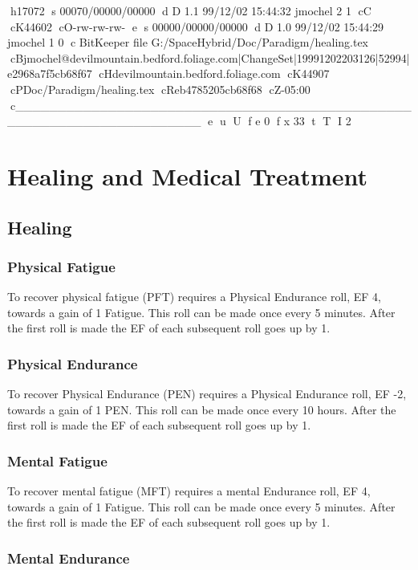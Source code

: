 h17072
s 00070/00000/00000
d D 1.1 99/12/02 15:44:32 jmochel 2 1
cC
cK44602
cO-rw-rw-rw-
e
s 00000/00000/00000
d D 1.0 99/12/02 15:44:29 jmochel 1 0
c BitKeeper file G:/SpaceHybrid/Doc/Paradigm/healing.tex
cBjmochel@devilmountain.bedford.foliage.com|ChangeSet|19991202203126|52994|e2968a7f5cb68f67
cHdevilmountain.bedford.foliage.com
cK44907
cPDoc/Paradigm/healing.tex
cReb4785205cb68f68
cZ-05:00
c______________________________________________________________________
e
u
U
f e 0
f x 33
t
T
I 2
\chapter{Healing and Medical Treatment}

\section{Healing}

\subsection{Physical Fatigue}

To recover physical fatigue (PFT) requires a Physical Endurance 
roll,  EF 4, towards a gain of 1 Fatigue. This roll can be made once 
every 5 minutes. After the first roll is made the EF of each 
subsequent roll goes up by 1. 

\subsection{Physical Endurance}

To recover Physical Endurance (PEN) requires a Physical Endurance 
roll, EF -2, towards a gain of 1 PEN.  This roll can be made once 
every 10 hours. After the first roll is made the EF of each 
subsequent roll goes up by 1. 

\subsection{Mental Fatigue}

To recover mental fatigue (MFT) requires a mental Endurance 
roll,  EF 4, towards a gain of 1 Fatigue. This roll can be made once 
every 5 minutes. After the first roll is made the EF of each 
subsequent roll goes up by 1. 

\subsection{Mental Endurance}

